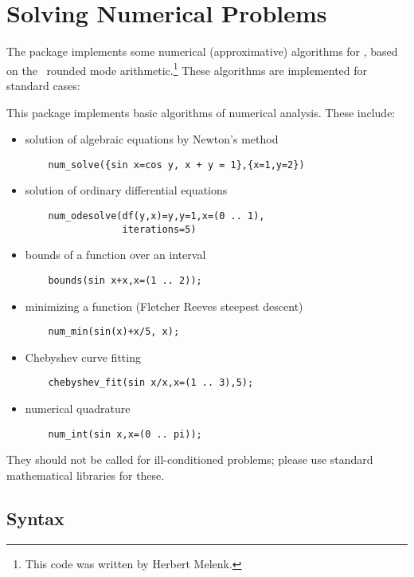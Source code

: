 
\chapter{Solving Numerical Problems}



The  package implements some numerical (approximative)
algorithms for \REDUCE, based on the \REDUCE\ rounded mode
arithmetic.\footnote{This code was written by Herbert Melenk.}
These algorithms are implemented for standard cases:

This package implements basic algorithms of numerical analysis.
These include:
\begin{itemize}
\item solution of algebraic equations by Newton's method
\begin{verbatim}
    num_solve({sin x=cos y, x + y = 1},{x=1,y=2})
\end{verbatim}
\item solution of ordinary differential equations
\begin{verbatim}
    num_odesolve(df(y,x)=y,y=1,x=(0 .. 1),
                 iterations=5)
\end{verbatim}
\item bounds of a function over an interval
\begin{verbatim}
    bounds(sin x+x,x=(1 .. 2));
\end{verbatim}
\item minimizing a function (Fletcher Reeves steepest descent)
\begin{verbatim}
    num_min(sin(x)+x/5, x);
\end{verbatim}
\item Chebyshev curve fitting
\begin{verbatim}
    chebyshev_fit(sin x/x,x=(1 .. 3),5);
\end{verbatim}
\item numerical quadrature
\begin{verbatim}
    num_int(sin x,x=(0 .. pi));
\end{verbatim}
\end{itemize}
They should not be called for ill-conditioned problems;
please use standard mathematical libraries for
these.


\section{Syntax}

